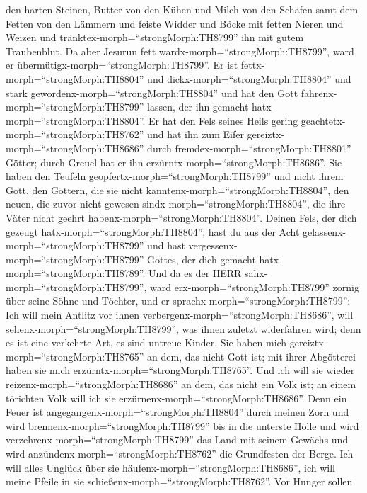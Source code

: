den harten Steinen,  Butter von den Kühen und Milch von den
Schafen samt dem Fetten von den Lämmern und feiste Widder und Böcke mit
fetten Nieren und Weizen und tränktex-morph=``strongMorph:TH8799'' ihn
mit gutem Traubenblut.  Da aber Jesurun fett
wardx-morph=``strongMorph:TH8799'', ward er
übermütigx-morph=``strongMorph:TH8799''. Er ist
fettx-morph=``strongMorph:TH8804'' und
dickx-morph=``strongMorph:TH8804'' und stark
gewordenx-morph=``strongMorph:TH8804'' und hat den Gott
fahrenx-morph=``strongMorph:TH8799'' lassen, der ihn gemacht
hatx-morph=``strongMorph:TH8804''. Er hat den Fels seines Heils gering
geachtetx-morph=``strongMorph:TH8762''  und hat ihn zum
Eifer gereiztx-morph=``strongMorph:TH8686'' durch
fremdex-morph=``strongMorph:TH8801'' Götter; durch Greuel hat er ihn
erzürntx-morph=``strongMorph:TH8686''.  Sie haben den
Teufeln geopfertx-morph=``strongMorph:TH8799'' und nicht ihrem Gott, den
Göttern, die sie nicht kanntenx-morph=``strongMorph:TH8804'', den neuen,
die zuvor nicht gewesen sindx-morph=``strongMorph:TH8804'', die ihre
Väter nicht geehrt habenx-morph=``strongMorph:TH8804''. 
Deinen Fels, der dich gezeugt hatx-morph=``strongMorph:TH8804'', hast du
aus der Acht gelassenx-morph=``strongMorph:TH8799'' und hast
vergessenx-morph=``strongMorph:TH8799'' Gottes, der dich gemacht
hatx-morph=``strongMorph:TH8789''.  Und da es der HERR
sahx-morph=``strongMorph:TH8799'', ward erx-morph=``strongMorph:TH8799''
zornig über seine Söhne und Töchter,  und er
sprachx-morph=``strongMorph:TH8799'': Ich will mein Antlitz vor ihnen
verbergenx-morph=``strongMorph:TH8686'', will
sehenx-morph=``strongMorph:TH8799'', was ihnen zuletzt widerfahren wird;
denn es ist eine verkehrte Art, es sind untreue Kinder. 
Sie haben mich gereiztx-morph=``strongMorph:TH8765'' an dem, das nicht
Gott ist; mit ihrer Abgötterei haben sie mich
erzürntx-morph=``strongMorph:TH8765''. Und ich will sie wieder
reizenx-morph=``strongMorph:TH8686'' an dem, das nicht ein Volk ist; an
einem törichten Volk will ich sie
erzürnenx-morph=``strongMorph:TH8686''.  Denn ein Feuer ist
angegangenx-morph=``strongMorph:TH8804'' durch meinen Zorn und wird
brennenx-morph=``strongMorph:TH8799'' bis in die unterste Hölle und wird
verzehrenx-morph=``strongMorph:TH8799'' das Land mit seinem Gewächs und
wird anzündenx-morph=``strongMorph:TH8762'' die Grundfesten der Berge.
 Ich will alles Unglück über sie
häufenx-morph=``strongMorph:TH8686'', ich will meine Pfeile in sie
schießenx-morph=``strongMorph:TH8762''.  Vor Hunger sollen
